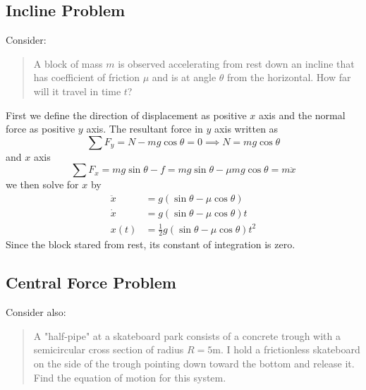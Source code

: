 \documentclass[../../../main.tex]{subfiles}
\begin{document}
\subsection*{Incline Problem}
Consider:
\begin{quotation}
    A block of mass $m$ is observed accelerating from rest down an incline that has coefficient of friction $\mu$ and is at angle $\theta$ from the horizontal. How far will it travel in time $t$?
\end{quotation}
\begin{figure*}[h]
    \centering
\end{figure*}

First we define the direction of displacement as positive $x$ axis and the normal force as positive $y$ axis. The resultant force in $y$ axis written as 
\begin{equation*}
    \sum F_y=N-mg\cos\theta=0 \implies N=mg\cos \theta
\end{equation*}
and $x$ axis
\begin{equation*}
    \sum F_x=mg\sin\theta -f= mg\sin\theta -\mu mg\cos \theta=m\ddot{x}
\end{equation*}
we then solve for $x$ by 
\begin{align*}
    \ddot{x}&=g\left(\sin\theta -\mu \cos \theta\right)\\
    \dot{x}&=g\left(\sin\theta -\mu \cos \theta\right)t\\
    x(t)&=\frac{1}{2}g\left(\sin\theta -\mu \cos \theta\right)t^2
\end{align*}
Since the block stared from rest, its constant of integration is zero.

\subsection*{Central Force Problem}
Consider also:
\begin{quotation}
    A "half-pipe" at a skateboard park consists of a concrete trough with a semicircular cross section of radius $R = 5 $m. I hold a frictionless skateboard on the side of the trough pointing down toward the bottom and release it. Find the equation of motion for this system.
\end{quotation}

\begin{figure*}[h]
    \centering
\end{figure*}
\end{document}
